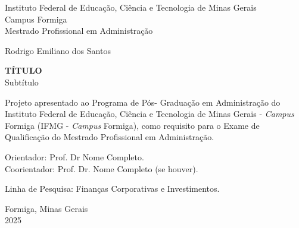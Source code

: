 
\thispagestyle{empty}

\begin{center}
    \small
    \sc Instituto Federal de Educação, Ciência e Tecnologia de Minas Gerais \\ 
    \sc Campus Formiga \\
    \sc Mestrado Profissional em Administração
    
   
    \vspace{3cm}
    \large {Rodrigo Emiliano dos Santos}
    
    \vspace{3cm}
     \large \textbf{TÍTULO} \\
    Subtítulo
    
    \vspace{2cm}
    \begin{flushright}
    \begin{minipage}{0.6\textwidth}
    \small
    Projeto apresentado ao Programa de Pós-
    Graduação em Administração do Instituto
    Federal de Educação, Ciência e
    Tecnologia de Minas Gerais - \textit{Campus} Formiga 
    (IFMG - \textit{Campus} Formiga), como requisito para 
    o Exame de Qualificação do Mestrado Profissional em 
    Administração.
    \end{minipage}
    \end{flushright}
    
    \vspace{0.5cm}
    \begin{flushright}
    \small
    Orientador: Prof. Dr Nome Completo.\\
    Coorientador: Prof. Dr. Nome Completo (se houver).
    
    \vspace{0.5cm}
    Linha de Pesquisa: Finanças Corporativas e Investimentos.
    \end{flushright}
    
    \vfill
    Formiga, Minas Gerais \\
    2025
\end{center}


\newpage

\thispagestyle{empty}

\newenvironment{meuresumo}{
  \clearpage
  \small
  \vspace{-1cm}
  \begin{center}
    \bfseries RESUMO
    \vspace{0.5em}
  \end{center}
  \begin{quote}
}{
  \end{quote}
  \vspace{-1.1em}
  \begin{center}
  \begin{minipage}{0.87\textwidth} 
  \textbf{Palavras-chave:} palavra 1, palavra 2, palavra 3.
  \end{minipage}
  \end{center}
  \clearpage
}

